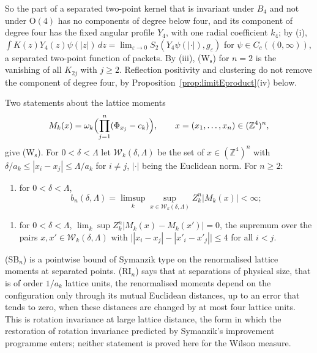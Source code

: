 \documentclass[aps,prd,twocolumn,superscriptaddress,nofootinbib,longbibliography,floatfix,amsmath,amssymb,10pt]{revtex4-2}
\theoremstyle{definition}
\theoremstyle{remark}
\newcommand{\Z}{\mathbb{Z}}
\begin{document}
So the part of a separated two-point kernel that is invariant under $B_4$
and not under $\mathrm O(4)$ has no components of degree below four, and
its component of degree four has the fixed angular profile $Y_4$, with one
radial coefficient $k_4$; by (i), $\int K(z)Y_4(z)\psi(|z|)\,dz=\lim_{\varepsilon\to0}
S_2(Y_4\psi(|\cdot|),g_\varepsilon)$ for $\psi\in C_c((0,\infty))$, a
separated two-point function of packets. By (iii), (W$_{\mathrm s}$) for
$n=2$ is the vanishing of all $K_{2j}$ with $j\ge2$. Reflection positivity
and clustering do not remove the component of degree four, by
Proposition~\ref{prop:limitEproduct}(iv) below.

Two statements about the lattice moments
\[
M_k(x)=\omega_k\Bigl(\prod_{j=1}^n(\Phi_{x_j}-c_k)\Bigr),\qquad
x=(x_1,\dots,x_n)\in(\Z^4)^n,
\]
give (W$_{\mathrm s}$). For $0<\delta<\Lambda$ let $\mathcal W_k(\delta,
\Lambda)$ be the set of $x\in(\Z^4)^n$ with $\delta/a_k\le|x_i-x_j|\le
\Lambda/a_k$ for $i\ne j$, $|\cdot|$ being the Euclidean norm. For $n\ge2$:
\begin{enumerate}[label=\textup{(SB$_n$)},leftmargin=*]
\item for $0<\delta<\Lambda$,
\[
b_n(\delta,\Lambda)=\limsup_k\sup_{x\in\mathcal W_k(\delta,\Lambda)}
Z_k^n|M_k(x)|<\infty ;
\]
\end{enumerate}
\begin{enumerate}[label=\textup{(RI$_n$)},leftmargin=*]
\item for $0<\delta<\Lambda$, $\lim_k\sup Z_k^n|M_k(x)-M_k(x')|=0$, the
supremum over the pairs $x,x'\in\mathcal W_k(\delta,\Lambda)$ with
$\bigl||x_i-x_j|-|x'_i-x'_j|\bigr|\le4$ for all $i<j$.
\end{enumerate}
(SB$_n$) is a pointwise bound of Symanzik type on the renormalised lattice
moments at separated points. (RI$_n$) says that at separations of physical
size, that is of order $1/a_k$ lattice units, the renormalised moments
depend on the configuration only through its mutual Euclidean distances,
up to an error that tends to zero, when these distances are changed by at
most four lattice units. This is rotation invariance at large lattice
distance, the form in which the restoration of rotation invariance
predicted by Symanzik's improvement programme enters; neither statement is
proved here for the Wilson measure.
\end{document}
